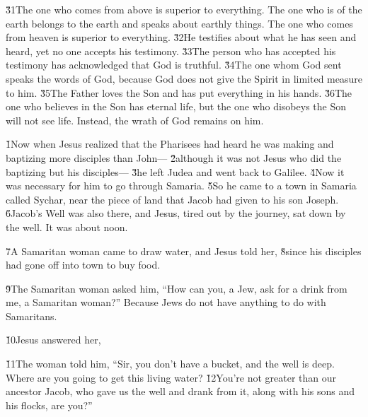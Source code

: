 \v{31}The one who comes from above is superior to everything. The one who is of the earth belongs to the earth and speaks about earthly things. The one who comes from heaven is superior to everything. \v{32}He testifies about what he has seen and heard, yet no one accepts his testimony. \v{33}The person who has accepted his testimony has acknowledged that God is truthful. \v{34}The one whom God sent speaks the words of God, because God does not give the Spirit in limited measure to him. \v{35}The Father loves the Son and has put everything in his hands. \v{36}The one who believes in the Son has eternal life, but the one who disobeys the Son will not see life. Instead, the wrath of God remains on him.

\v{1}Now when Jesus realized that the Pharisees had heard he was making and baptizing more disciples than John--- \v{2}although it was not Jesus who did the baptizing but his disciples--- \v{3}he left Judea and went back to Galilee. \v{4}Now it was necessary for him to go through Samaria. \v{5}So he came to a town in Samaria called Sychar, near the piece of land that Jacob had given to his son Joseph. \v{6}Jacob's Well was also there, and Jesus, tired out by the journey, sat down by the well. It was about noon.

\v{7}A Samaritan woman came to draw water, and Jesus told her,  \v{8}since his disciples had gone off into town to buy food.

\v{9}The Samaritan woman asked him, ``How can you, a Jew, ask for a drink from me, a Samaritan woman?'' Because Jews do not have anything to do with Samaritans.

\v{10}Jesus answered her, 

\v{11}The woman told him, ``Sir, you don't have a bucket, and the well is deep. Where are you going to get this living water? \v{12}You're not greater than our ancestor Jacob, who gave us the well and drank from it, along with his sons and his flocks, are you?''

